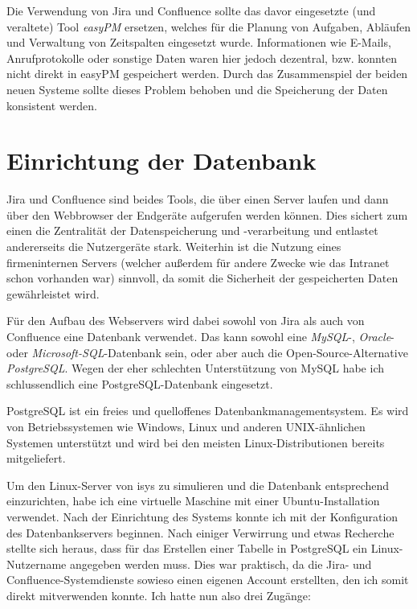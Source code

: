 \documentclass[xcolor=dvipsnames,11pt,paper=a4paper]{report}
\begin{document}
Die Verwendung von Jira und Confluence sollte das davor eingesetzte (und veraltete)
Tool \textit{easyPM} ersetzen, welches für die Planung von Aufgaben, Abläufen und
Verwaltung von Zeitspalten eingesetzt wurde. Informationen wie E-Mails, Anrufprotokolle
oder sonstige Daten waren hier jedoch dezentral, bzw. konnten nicht direkt in easyPM
gespeichert werden. Durch das Zusammenspiel der beiden neuen Systeme sollte dieses
Problem behoben und die Speicherung der Daten konsistent werden.



\section{Einrichtung der Datenbank}

Jira und Confluence sind beides Tools, die über einen Server laufen und dann über
den Webbrowser der Endgeräte aufgerufen werden können. Dies sichert zum einen die
Zentralität der Datenspeicherung und -verarbeitung und entlastet andererseits die
Nutzergeräte stark. Weiterhin ist die Nutzung eines firmeninternen Servers (welcher
außerdem für andere Zwecke wie das Intranet schon vorhanden war) sinnvoll, da somit
die Sicherheit der gespeicherten Daten gewährleistet wird.

Für den Aufbau des Webservers wird dabei sowohl von Jira als auch von Confluence
eine Datenbank verwendet. Das kann sowohl eine \textit{MySQL}-, \textit{Oracle}-
oder \textit{Microsoft-SQL}-Datenbank sein, oder aber auch die Open-Source-Alternative
\textit{PostgreSQL}. Wegen der eher schlechten Unterstützung von MySQL habe ich
schlussendlich eine PostgreSQL-Datenbank eingesetzt.

PostgreSQL ist ein freies und quelloffenes Datenbankmanagementsystem. Es wird von
Betriebssystemen wie Windows, Linux und anderen UNIX-ähnlichen Systemen unterstützt
und wird bei den meisten Linux-Distributionen bereits mitgeliefert.

Um den Linux-Server von isys zu simulieren und die Datenbank entsprechend einzurichten,
habe ich eine virtuelle Maschine mit einer Ubuntu-Installation verwendet. Nach der
Einrichtung des Systems konnte ich mit der Konfiguration des Datenbankservers beginnen.
Nach einiger Verwirrung und etwas Recherche stellte sich heraus, dass für das Erstellen
einer Tabelle in PostgreSQL ein Linux-Nutzername angegeben werden muss. Dies war
praktisch, da die Jira- und Confluence-Systemdienste sowieso einen eigenen Account
erstellten, den ich somit direkt mitverwenden konnte. Ich hatte nun also drei Zugänge:
\end{document}
